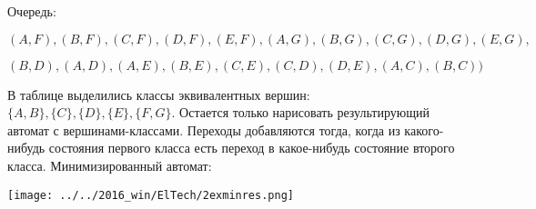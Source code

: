 \documentclass{article}
\begin{document}
Очередь: 

$
(A, F), (B, F), (C, F), (D, F), (E,F), (A, G), (B, G), (C, G), (D, G), (E, G),
$

$
(B, D), (A, D), (A, E), (B, E), (C, E), (C, D), (D, E), (A,C), (B, C))
$

В таблице выделились классы эквивалентных вершин: $\{A, B\}, \{C\}, \{D\}, \{E\}, \{F,G\}$. Остается только нарисовать результирующий автомат с вершинами-классами. Переходы добавляются тогда, когда из какого-нибудь состояния первого класса есть переход в какое-нибудь состояние второго класса. Минимизированный автомат: 

\texttt{[image: ../../2016\_win/ElTech/2exminres.png]}
\end{document}
